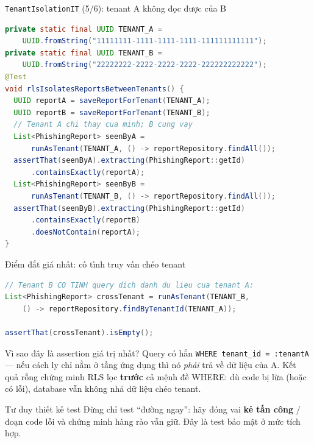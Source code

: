 \documentclass[aspectratio=169,12pt]{beamer}
\begin{document}
\begin{frame}[fragile]{\texttt{TenantIsolationIT} (5/6): tenant A không đọc được của B}
  \vspace*{-0.4em}
\begin{lstlisting}[language=Java,style=codesm,basicstyle=\ttfamily\scriptsize]
private static final UUID TENANT_A =
    UUID.fromString("11111111-1111-1111-1111-111111111111");
private static final UUID TENANT_B =
    UUID.fromString("22222222-2222-2222-2222-222222222222");
@Test
void rlsIsolatesReportsBetweenTenants() {
  UUID reportA = saveReportForTenant(TENANT_A);
  UUID reportB = saveReportForTenant(TENANT_B);
  // Tenant A chi thay cua minh; B cung vay
  List<PhishingReport> seenByA =
      runAsTenant(TENANT_A, () -> reportRepository.findAll());
  assertThat(seenByA).extracting(PhishingReport::getId)
      .containsExactly(reportA);
  List<PhishingReport> seenByB =
      runAsTenant(TENANT_B, () -> reportRepository.findAll());
  assertThat(seenByB).extracting(PhishingReport::getId)
      .containsExactly(reportB)
      .doesNotContain(reportA);
}
\end{lstlisting}
\end{frame}

\begin{frame}[fragile]{Điểm đắt giá nhất: cố tình truy vấn chéo tenant}
\begin{lstlisting}[language=Java,style=code]
// Tenant B CO TINH query dich danh du lieu cua tenant A:
List<PhishingReport> crossTenant = runAsTenant(TENANT_B,
    () -> reportRepository.findByTenantId(TENANT_A));

assertThat(crossTenant).isEmpty();
\end{lstlisting}
  \begin{block}{Vì sao đây là assertion giá trị nhất?}
    Query có hẳn \texttt{WHERE tenant\_id = :tenantA} --- nếu cách ly chỉ nằm
    ở tầng ứng dụng thì nó \emph{phải} trả về dữ liệu của A. Kết quả rỗng
    chứng minh RLS lọc \textbf{trước} cả mệnh đề WHERE: dù code bị lừa
    (hoặc có lỗi), database vẫn không nhả dữ liệu chéo tenant.
  \end{block}
  \begin{exampleblock}{Tư duy thiết kế test}
    Đừng chỉ test ``đường ngay'': hãy đóng vai \textbf{kẻ tấn công} / đoạn
    code lỗi và chứng minh hàng rào vẫn giữ. Đây là test bảo mật ở mức tích
    hợp.
  \end{exampleblock}
\end{frame}
\end{document}
